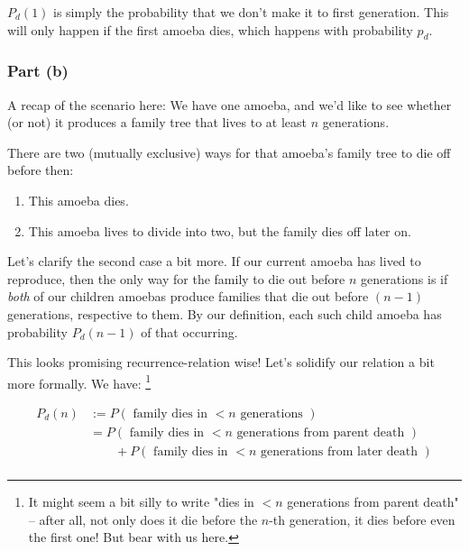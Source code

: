 $P_d(1)$ is simply the probability that we don't make it to first generation. This will only happen if the first amoeba dies, which happens with probability $p_d$.



\subsubsection{Part (b)}

A recap of the scenario here: We have one amoeba, and we'd like to see whether (or not) it produces a family tree that lives to at least $n$ generations.

There are two (mutually exclusive) ways for that amoeba's family tree to die off before then: 
\begin{enumerate}
\item This amoeba dies.
\item This amoeba lives to divide into two, but the family dies off later on.
\end{enumerate} \hfill

Let's clarify the second case a bit more. If our current amoeba has lived to reproduce, then the only way for the family to die out before $n$ generations is if \emph{both} of our children amoebas produce families that die out before $(n-1)$ generations, respective to them. By our definition, each such child amoeba has probability $P_d(n-1)$ of that occurring.

This looks promising recurrence-relation wise! Let's solidify our relation a bit more formally. We have: \footnote{It might seem a bit silly to write "dies in $<n$ generations from parent death" -- after all, not only does it die before the $n$-th generation, it dies before even the first one! But bear with us here.}

\begin{align*}
P_d(n) &:= P(\text{ family dies in $< n$ generations }) \\
&= P(\text{ family dies in $< n$ generations from parent death }) \\
&\qquad + P(\text{ family dies in $< n$ generations from later death }) \\ %
\end{align*}


